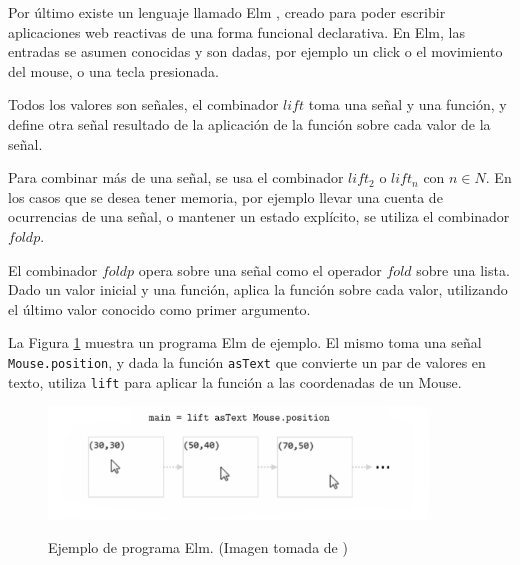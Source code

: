 

Por último existe un lenguaje llamado Elm \cite{evanczaplicki2012:Elm},
creado para poder escribir aplicaciones web reactivas
de una forma funcional declarativa.
  En Elm, las entradas se asumen conocidas y son dadas,
por ejemplo un click o el movimiento del mouse,
o una tecla presionada.

  Todos los valores son señales, el combinador $lift$
toma una señal y una función, y define otra señal resultado
de la aplicación de la función sobre cada valor de la señal.

  Para combinar más de una señal, se usa el combinador $lift_2$ o
$lift_n$ con $n \in N$.
  En los casos que se desea tener memoria, por ejemplo llevar una
cuenta de ocurrencias de una señal, o mantener un estado explícito,
se utiliza el combinador $foldp$.

  El combinador $foldp$ opera sobre una señal como el
operador $fold$ sobre una lista.
  Dado un valor inicial y una función, aplica la función sobre
cada valor, utilizando el último valor conocido como primer argumento.

  La Figura \ref{fig:elmexample} muestra un programa Elm de ejemplo.
  El mismo toma una señal \texttt{Mouse.position}, y dada la función
  \texttt{asText} que convierte un par de valores en texto, utiliza
  \texttt{lift} para aplicar la función a las coordenadas de un Mouse.
 
\begin{figure}[h]
  \begin{center}
  \caption{Ejemplo de programa Elm. (Imagen tomada de \cite{evanczaplicki2012:Elm})}
  \includegraphics[width=0.9\textwidth]{graphs/elmexample.png}
  \label{fig:elmexample}
  \end{center}
\end{figure}
